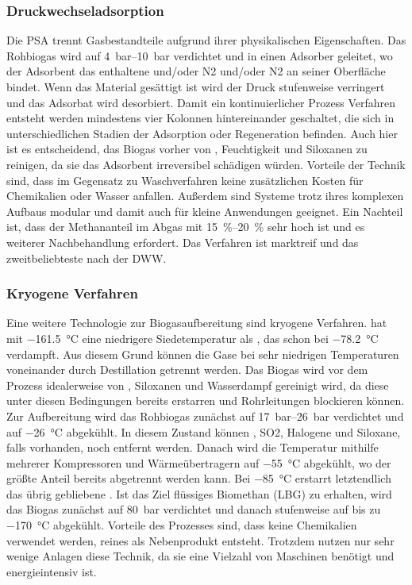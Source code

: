 \subsubsection{Druckwechseladsorption}\label{chap:PSA}

Die \gls{PSA} trennt Gasbestandteile aufgrund ihrer physikalischen Eigenschaften. Das Rohbiogas wird auf \SIrange{4}{10}{\bar} verdichtet und in einen Adsorber geleitet, wo der Adsorbent das enthaltene  und/oder {N2} und/oder {N2} an seiner Oberfläche bindet. Wenn das Material gesättigt ist wird der Druck stufenweise verringert und das Adsorbat wird desorbiert. Damit ein kontinuierlicher Prozess Verfahren entsteht werden mindestens vier Kolonnen hintereinander geschaltet, die sich in unterschiedlichen Stadien der Adsorption oder Regeneration befinden. Auch hier ist es entscheidend, das Biogas vorher von , Feuchtigkeit und Siloxanen zu reinigen, da sie das Adsorbent irreversibel schädigen würden. Vorteile der Technik sind, dass im Gegensatz zu Waschverfahren keine zusätzlichen Kosten für Chemikalien oder Wasser anfallen. Außerdem sind Systeme trotz ihres komplexen Aufbaus modular und damit auch für kleine Anwendungen geeignet. Ein Nachteil ist, dass der Methananteil im Abgas mit \SIrange{15}{20}{\percent} sehr hoch ist und es weiterer Nachbehandlung erfordert. Das Verfahren ist marktreif und das zweitbeliebteste nach der \gls{DWW}. \parencite{BHPT13} \parencite{KGKK2019} 


\subsubsection{Kryogene Verfahren}\label{chap:kryo}

Eine weitere Technologie zur Biogasaufbereitung sind kryogene Verfahren.  hat mit \SI{-161,5}{\degreeCelsius} eine niedrigere Siedetemperatur als , das schon bei \SI{-78,2}{\degreeCelsius} verdampft. Aus diesem Grund können die Gase bei sehr niedrigen Temperaturen voneinander durch Destillation getrennt werden. Das Biogas wird vor dem Prozess idealerweise von , Siloxanen und Wasserdampf gereinigt wird, da diese unter diesen Bedingungen bereits erstarren und Rohrleitungen blockieren können. Zur Aufbereitung wird das Rohbiogas zunächst auf \SIrange{17}{26}{\bar} verdichtet und auf \SI{-26}{\degreeCelsius} abgekühlt. In diesem Zustand können , {SO2}, Halogene und Siloxane, falls vorhanden, noch entfernt werden. Danach wird die Temperatur mithilfe mehrerer Kompressoren und Wärmeübertragern auf \SI{-55}{\degreeCelsius} abgekühlt, wo der größte Anteil  bereits abgetrennt werden kann. Bei \SI{-85}{\degreeCelsius} erstarrt letztendlich das übrig gebliebene .   
Ist das Ziel flüssiges Biomethan (LBG) zu erhalten, wird das Biogas zunächst auf \SI{80}{\bar} verdichtet und danach stufenweise auf bis zu \SI{-170}{\degreeCelsius} abgekühlt. Vorteile des Prozesses sind, dass keine Chemikalien verwendet werden, reines  als Nebenprodukt entsteht. Trotzdem nutzen nur sehr wenige Anlagen diese Technik, da sie eine Vielzahl von Maschinen benötigt und energieintensiv ist.  \parencite{KGKK2019} \parencite{AONC2019} 


